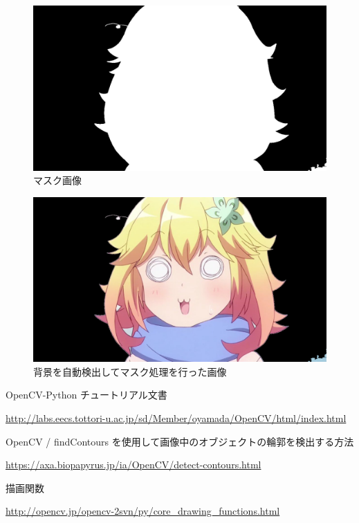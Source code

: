 \documentclass[dvipdfmx]{jsarticle}
\begin{document}
\begin{figure}[H]
  \centering
  \includegraphics[width=0.7\hsize]{../pic/silhouette.png}
  \caption{マスク画像}
  \label{fig:mask}
\end{figure}

\begin{figure}[H]
  \centering
  \includegraphics[width=0.7\hsize]{../pic/tapu_bb.png}
  \caption{背景を自動検出してマスク処理を行った画像}
  \label{fig:masked}
\end{figure}

\begin{thebibliography}{10}
   OpenCV-Python チュートリアル文書

  \url{http://labs.eecs.tottori-u.ac.jp/sd/Member/oyamada/OpenCV/html/index.html}

   OpenCV / findContours を使用して画像中のオブジェクトの輪郭を検出する方法

  \url{https://axa.biopapyrus.jp/ia/OpenCV/detect-contours.html}

   描画関数

  \url{http://opencv.jp/opencv-2svn/py/core_drawing_functions.html}
\end{thebibliography}
\end{document}
